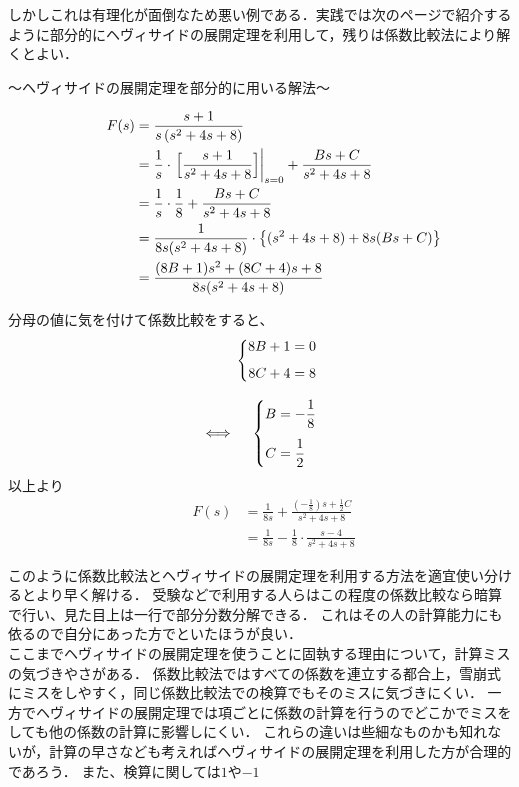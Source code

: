 \documentclass[a4paper,12pt]{report}
\begin{document}
\quad しかしこれは有理化が面倒なため悪い例である．実践では次のページで紹介するように部分的にヘヴィサイドの展開定理を利用して，残りは係数比較法により解くとよい．

\newpage

～ヘヴィサイドの展開定理を部分的に用いる解法～

\begin{align*}
  \qquad F(s) &= \frac{s+1}{s \left(s^2+4s+8\right)} \\
      &= \frac{1}{s} \cdot \left.\Bigl[\frac{s+1}{s^2+4s+8}\Bigr]\right|_{s=0}
      + \frac{Bs+C}{s^2+4s+8} \\
      &= \frac{1}{s} \cdot \frac{1}{8}
      + \frac{Bs+C}{s^2+4s+8} \\
      &=\frac{1}{8s(s^2+4s+8)} \cdot \left\{(s^2+4s+8)+8s(Bs+C) \right\} \\
      &=\frac{(8B+1)s^2+(8C+4)s+8}{8s(s^2+4s+8)}
\end{align*}

分母の値に気を付けて係数比較をすると、
\begin{align*}
  \left\{
    \begin{aligned}
      8B + 1 &= 0 \\[1ex]
      8C + 4 &= 8
    \end{aligned}
  \right. \notag \\[2ex]
  \iff\quad
  \left\{
    \begin{aligned}
      B &= - \frac{1}{8} \\[1ex]
      C &=  \frac{1}{2}
    \end{aligned}
  \right. \notag \\
  \end{align*}
以上より
\begin{align*}
  \qquad F(s) &=\frac{1}{8s} + \frac{(-\frac{1}{8})s+\frac{1}{2}C}{s^2+4s+8} \\
  &=\frac{1}{8s} -\frac{1}{8} \cdot \frac{s-4}{s^2+4s+8}
\end{align*}

このように係数比較法とヘヴィサイドの展開定理を利用する方法を適宜使い分けるとより早く解ける．
受験などで利用する人らはこの程度の係数比較なら暗算で行い、見た目上は一行で部分分数分解できる．
これはその人の計算能力にも依るので自分にあった方でといたほうが良い．\\

ここまでヘヴィサイドの展開定理を使うことに固執する理由について，計算ミスの気づきやさがある．
係数比較法ではすべての係数を連立する都合上，雪崩式にミスをしやすく，同じ係数比較法での検算でもそのミスに気づきにくい．
一方でヘヴィサイドの展開定理では項ごとに係数の計算を行うのでどこかでミスをしても他の係数の計算に影響しにくい．
これらの違いは些細なものかも知れないが，計算の早さなども考えればヘヴィサイドの展開定理を利用した方が合理的であろう．
また、検算に関しては\(1\)や\(-1\)
\end{document}
